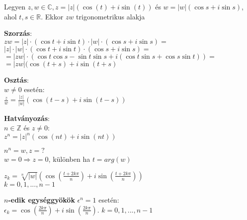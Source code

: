 \begin{frame}
\begin{tcolorbox}[title={Def.: Moivre azonosságok}]
Legyen $z, w \in \mathbb{C}, z = |z|({\cos}(t) + i{\sin}(t))$ és $w = |w|({\cos}s + i {\sin}s)$, ahol $t, s \in \mathbb{R}$. Ekkor $zw$ trigonometrikus alakja\\
\mbigskip

\textbf{Szorzás}:\\
$zw = |z| \cdot ({\cos}t + i{\sin}t) \cdot |w| \cdot ({\cos}s + i{\sin}s) =$\\
$|z| \cdot |w| \cdot ({\cos}t + i{\sin}t) \cdot ({\cos}s + i{\sin}s) =$\\
$= |zw| \cdot ({\cos}t{\cos}s - {\sin}t{\sin}s + i({\cos}t{\sin}s + {\cos}s{\sin}t)) =$\\
$= |zw|({\cos}(t + s) + i{\sin}(t + s)$\\
\mbigskip

\textbf{Osztás}:\\
$w \neq 0$ esetén:\\
$\frac{z}{w} = \frac{|z|}{|w|}({\cos}(t - s) + i {\sin}(t - s))$\\
\mbigskip

\textbf{Hatványozás}:\\
$n \in \mathbb{Z}$ és $z \neq 0$:\\
$z^n = |z|^n({\cos}(nt) + i{\sin}(nt))$
\end{tcolorbox}

\begin{tcolorbox}[title={Def.: Gyökvonás komplex számokból}]
$n^n = w, z = ?$\\
$w = 0 \Rightarrow z = 0$, különben ha $t = arg(w)$\\
\msmallskip

$z_k = \sqrt[n]{|w|}({\cos}(\frac{t + 2k{\pi}}{n}) + i{\sin}(\frac{t + 2k{\pi}}{n}))$\\
$k = 0, 1, ..., n - 1$\\
\mbigskip

\textbf{$n$-edik egységgyökök} ${\epsilon}^n = 1$ esetén:\\
${\epsilon}_k = {\cos}(\frac{2k{\pi}}{n}) + i{\sin}(\frac{2k{\pi}}{n})$. $k = 0, 1, ..., n - 1$
\end{tcolorbox}
\end{frame}

